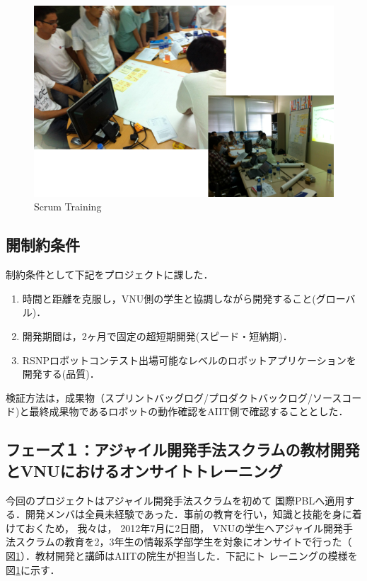 \documentclass[a4j, 12Q, twocolumn, twoside]{jsarticle}
\begin{document}
\begin{figure}
  \begin{center}
    \includegraphics[width=\columnwidth]{./figures/training.png}
    \caption{Scrum Training}
    \label{fig:training}
  \end{center}
\end{figure}

\subsection{開制約条件}
制約条件として下記をプロジェクトに課した．
\begin{enumerate}
\item 時間と距離を克服し，VNU側の学生と協調しながら開発すること(グローバル)．
\item 開発期間は，2ヶ月で固定の超短期開発(スピード・短納期)．
\item RSNPロボットコンテスト出場可能なレベルのロボットアプリケーションを開発する(品質)．
\end{enumerate}

検証方法は，成果物（スプリントバッグログ/プロダクトバックログ/ソースコード)と最終成果物であるロボットの動作確認をAIIT側で確認することとした．

\subsection{フェーズ１：アジャイル開発手法スクラムの教材開発とVNUにおけるオンサイトトレーニング}
今回のプロジェクトはアジャイル開発手法スクラムを初めて
国際PBLへ適用する．開発メンバは全員未経験であった．事前の教育を行い，知識と技能を身に着けておくため，
我々は， 2012年7月に2日間，
VNUの学生へアジャイル開発手法スクラムの教育を2，3年生の情報系学部学生を対象にオンサイトで行った（
図\ref{fig:training}）．教材開発と講師はAIITの院生が担当した．下記にト
レーニングの模様を図\ref{fig:training}に示す．
\end{document}
